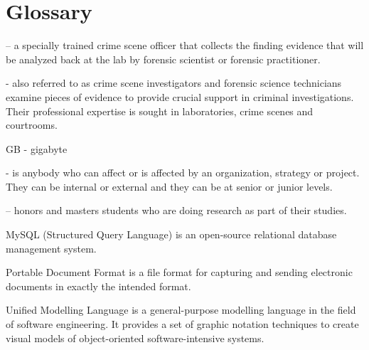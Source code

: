 \documentclass[10pt,a4paper]{article}
\begin{document}
\section{Glossary}
\begin{description}
	\item [Forensic officer (FO)] – a specially trained crime scene officer that collects the finding evidence that will be analyzed back at the lab by forensic scientist or forensic practitioner. 
	\item [Forensic practitioner (FP)] - also referred to as crime scene investigators and forensic science technicians examine pieces of evidence to provide crucial support in criminal investigations. Their professional expertise is sought in laboratories, crime scenes and courtrooms.
	\item GB - gigabyte
	\item [Stakeholders] - is anybody who can affect or is affected by an organization, strategy or project. They can be internal or external and they can be at senior or junior levels.
	\item [Students] – honors and masters students who are doing research as part of their studies.
	\item[MySQL] MySQL (Structured Query Language) is an open-source relational database management system.
	
	\item[PDF] Portable Document Format is a file format for capturing and sending electronic documents in exactly the intended format.
	\item[UML] Unified Modelling Language is a general-purpose modelling language in the field of software engineering. It provides a set of graphic notation techniques to create visual models of object-oriented software-intensive systems. 
	

\end{description}
\end{document}
